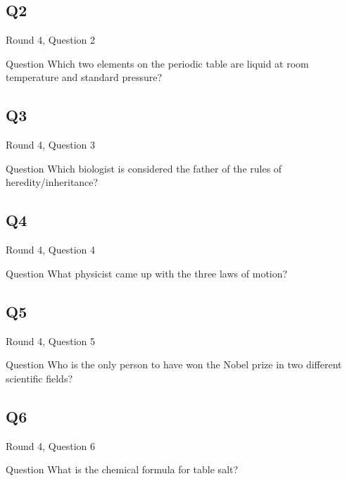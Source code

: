 \documentclass[11pt]{beamer}
\begin{document}
\subsection*{Q2}
\begin{frame}[t]{Round 4, Question 2}
\vspace{0.5em}
\begin{block}{Question}
Which two elements on the periodic table are liquid at room temperature and standard pressure?
\end{block}
\end{frame}
    

\subsection*{Q3}
\begin{frame}[t]{Round 4, Question 3}
\vspace{0.5em}
\begin{block}{Question}
Which biologist is considered the father of the rules of heredity/inheritance?
\end{block}
\end{frame}
    

\subsection*{Q4}
\begin{frame}[t]{Round 4, Question 4}
\vspace{0.5em}
\begin{block}{Question}
What physicist came up with the three laws of motion?
\end{block}
\end{frame}
    

\subsection*{Q5}
\begin{frame}[t]{Round 4, Question 5}
\vspace{0.5em}
\begin{block}{Question}
Who is the only person to have won the Nobel prize in two different scientific fields?
\end{block}
\end{frame}
    

\subsection*{Q6}
\begin{frame}[t]{Round 4, Question 6}
\vspace{0.5em}
\begin{block}{Question}
What is the chemical formula for table salt?
\end{block}
\end{frame}
    
\end{document}
